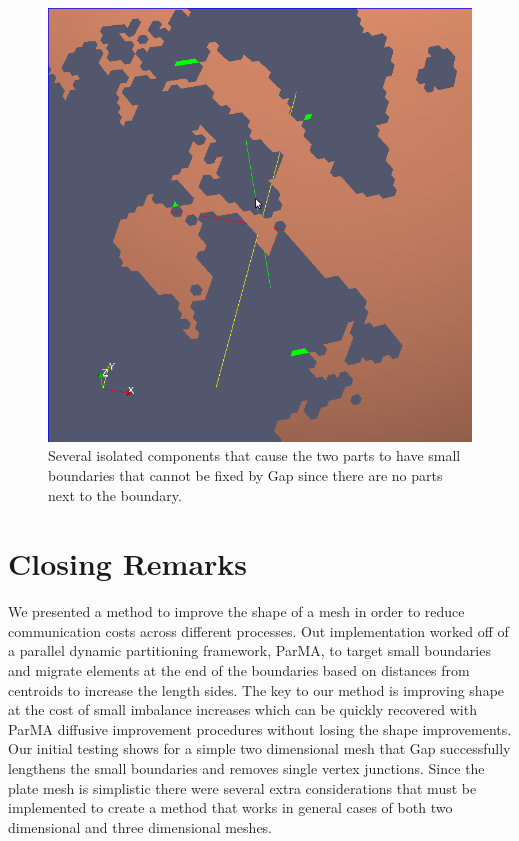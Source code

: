 \documentclass{thesis}
\begin{document}
\begin{figure} [!ht]
\centering
\captionsetup{justification=centering,margin=1cm}
\includegraphics[width=.65\textwidth]{Ocean_Isolated.png}
\caption{\label{fig:ocean} \textnormal{Several isolated components that cause the two parts to have small boundaries that cannot be fixed by Gap since there are no parts next to the boundary.}}
\end{figure}


\chapter{Closing Remarks}

We presented a method to improve the shape of a mesh in order to reduce 
communication costs across different processes. Out implementation worked off of 
a parallel dynamic partitioning framework, ParMA, to target small boundaries 
and migrate elements at the end of the boundaries based on distances from 
centroids to increase the length sides. The key to our method is improving 
shape at the cost of small imbalance increases which can be quickly recovered 
with ParMA diffusive improvement procedures without losing the shape 
improvements. Our initial testing shows for a simple two dimensional mesh that 
Gap successfully lengthens the small boundaries and removes single vertex junctions. 
Since the plate mesh is 
simplistic there were several extra considerations that must be implemented 
to create a method that works in general cases of both two dimensional and 
three dimensional meshes. 

\endgroup




\end{document}
